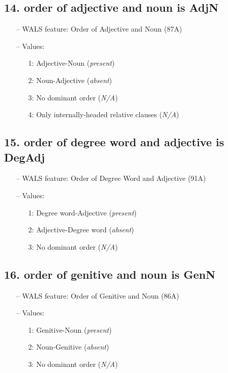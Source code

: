 \subsection*{14. order of adjective and noun is AdjN}

\begin{itemize}
  \item[--] WALS feature: Order of Adjective and Noun (87A)
  \item[--] Values:
  {\small
  \begin{enumerate}
    \item[1:] Adjective-Noun (\emph{present})
    \item[2:] Noun-Adjective (\emph{absent})
    \item[3:] No dominant order (\emph{N/A})
    \item[4:] Only internally-headed relative clauses (\emph{N/A})
  \end{enumerate}
  }
\end{itemize}


\subsection*{15. order of degree word and adjective is DegAdj}

\begin{itemize}
  \item[--] WALS feature: Order of Degree Word and Adjective (91A)
  \item[--] Values:
  {\small
  \begin{enumerate}
    \item[1:] Degree word-Adjective (\emph{present})
    \item[2:] Adjective-Degree word (\emph{absent})
    \item[3:] No dominant order (\emph{N/A})
  \end{enumerate}
  }
\end{itemize}


\subsection*{16. order of genitive and noun is GenN}

\begin{itemize}
  \item[--] WALS feature: Order of Genitive and Noun (86A)
  \item[--] Values:
  {\small
  \begin{enumerate}
    \item[1:] Genitive-Noun (\emph{present})
    \item[2:] Noun-Genitive (\emph{absent})
    \item[3:] No dominant order (\emph{N/A})
  \end{enumerate}
  }
\end{itemize}


